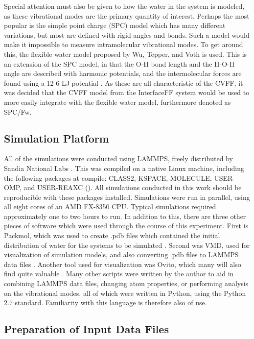 			Special attention must also be given to how the water in the system is modeled, as these vibrational modes are the primary quantity of interest. Perhaps the most popular is the simple point charge (SPC) model which has many different variations, but most are defined with rigid angles and bonds. Such a model would make it impossible to measure intramolecular vibrational modes. To get around this, the flexible water model proposed by Wu, Tepper, and Voth is used. This is an extension of the SPC model, in that the O-H bond length and the H-O-H angle are described with harmonic potentials, and the intermolecular forces are found using a 12-6 LJ potential \cite{wu2006flexible}. As these are all characteristic of the CVFF, it was decided that the CVFF model from the InterfaceFF system would be used to more easily integrate with the flexible water model, furthermore denoted as SPC/Fw.
			
		\subsection{Simulation Platform}
			All of the simulations were conducted using LAMMPS, freely distributed by Sandia National Labs \cite{plimpton1995fast}. This was compiled on a native Linux machine, including the following packages at compile: CLASS2, KSPACE, MOLECULE, USER-OMP, and USER-REAXC (\cite{aktulga2012parallel}). All simulations conducted in this work should be reproducible with these packages installed. Simulations were run in parallel, using all eight cores of an AMD FX-8350 CPU. Typical simulations required approximately one to two hours to run. In addition to this, there are three other pieces of software which were used through the course of this experiment. First is Packmol, which was used to create .pdb files which contained the initial distribution of water for the systems to be simulated \cite{martinez2009packmol}. Second was VMD, used for visualization of simulation models, and also converting .pdb files to LAMMPS data files \cite{humphrey1996vmd}. Another tool used for visualization was Ovito, which many will also find quite valuable \cite{stukowski2009Ovito}. Many other scripts were written by the author to aid in combining LAMMPS data files, changing atom properties, or performing analysis on the vibrational modes, all of which were written in Python, using the Python 2.7 standard. Familiarity with this language is therefore also of use.
			
		\subsection{Preparation of Input Data Files}
